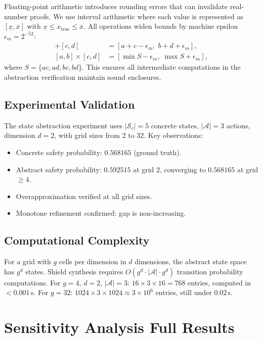 \documentclass[11pt]{article}
\newcommand{\cA}{\mathcal{A}}
\newcommand{\cS}{\mathcal{S}}
\begin{document}
Floating-point arithmetic introduces rounding errors that can
invalidate real-number proofs.  We use interval arithmetic where each
value is represented as $[\underline{x}, \overline{x}]$ with
$\underline{x} \leq x_{\mathrm{true}} \leq \overline{x}$.  All
operations widen bounds by machine epsilon
$\epsilon_m = 2^{-52}$:
\begin{align}
  [a, b] + [c, d] &= [a + c - \epsilon_m, \;
    b + d + \epsilon_m], \\
  [a, b] \times [c, d] &= [\min S - \epsilon_m, \;
    \max S + \epsilon_m],
\end{align}
where $S = \{ac, ad, bc, bd\}$.  This ensures all intermediate
computations in the abstraction verification maintain sound enclosures.

\subsection{Experimental Validation}

The state abstraction experiment uses $|\cS_c| = 5$ concrete states,
$|\cA| = 3$ actions, dimension $d = 2$, with grid sizes from $2$ to
$32$.  Key observations:
\begin{itemize}[nosep]
  \item Concrete safety probability: $0.568165$ (ground truth).
  \item Abstract safety probability: $0.592515$ at grid $2$,
        converging to $0.568165$ at grid $\geq 4$.
  \item Overapproximation verified at all grid sizes.
  \item Monotone refinement confirmed: gap is non-increasing.
\end{itemize}

\subsection{Computational Complexity}

For a grid with $g$ cells per dimension in $d$ dimensions, the
abstract state space has $g^d$ states.  Shield synthesis requires
$O(g^d \cdot |\cA| \cdot g^d)$ transition probability computations.
For $g = 4$, $d = 2$, $|\cA| = 3$: $16 \times 3 \times 16 = 768$
entries, computed in $< 0.001$\,s.  For $g = 32$:
$1024 \times 3 \times 1024 \approx 3 \times 10^6$ entries, still
under $0.02$\,s.


\section{Sensitivity Analysis Full Results}\label{app:sensitivity}
\end{document}
